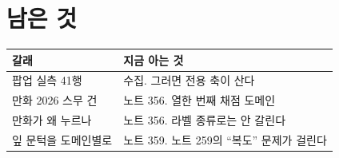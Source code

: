 \documentclass[11pt]{article}
\begin{document}
\section{남은 것}

\begin{center}
\begin{tabular}{ll}
\hline
갈래 & 지금 아는 것 \\
\hline
팝업 실측 41행 & 수집. 그러면 전용 축이 산다 \\
만화 2026 스무 건 & 노트 356. 열한 번째 채점 도메인 \\
만화가 왜 누르나 & 노트 356. 라벨 종류로는 안 갈린다 \\
잎 문턱을 도메인별로 & 노트 359. 노트 259의 ``복도'' 문제가 걸린다 \\
\hline
\end{tabular}
\end{center}
\end{document}

